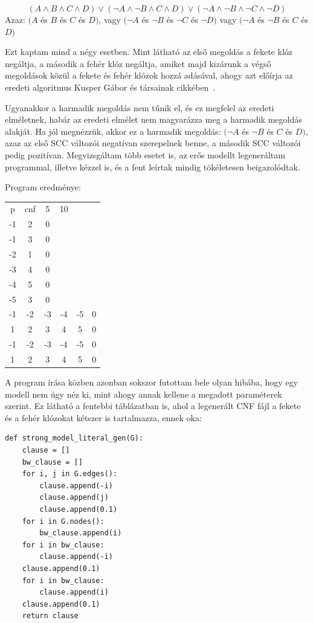 \documentclass[
]{thesis-ekf}
\theoremstyle{definition}
\theoremstyle{remark}
\begin{document}
	\[ (A\wedge B\wedge C\wedge D)\vee (\neg A\wedge\neg B\wedge C\wedge D)\vee (\neg A\wedge\neg B\wedge\neg C\wedge\neg D) \]
	Azaz: $(A$ és $B$ és $C$ és $D)$, vagy $( \neg A $ és $ \neg B $ és $ \neg C $ és $ \neg D )$ vagy $( \neg A $ és $ \neg B $ és $C$ és $D)$
	
	Ezt kaptam mind a négy esetben. Mint látható az első megoldás a fekete klóz negáltja, a második a fehér klóz negáltja, amiket majd kizárunk a végső megoldások közül a fekete és fehér klózok hozzá adásával, ahogy azt előírja az eredeti algoritmus Kusper Gábor és társainak cikkében~\cite{am}.
	
	Ugyanakkor a harmadik megoldás nem tűnik el, és ez megfelel az eredeti elméletnek, habár az eredeti elmélet nem magyarázza meg a harmadik megoldás alakját. Ha jól megnézzük, akkor ez a harmadik megoldás: $( \neg A $ és $ \neg B $ és $C$ és $D)$, azaz az első \textsc{SCC} változói negatívan szerepelnek benne, a második \textsc{SCC} változói pedig pozitívan. Megvizsgáltam több esetet is, az erős modellt legeneráltam programmal, illetve kézzel is, és a fent leírtak mindig tökéletesen beigazolódtak.
	
	Program eredménye:
	
	\begin{tabular}{cccccc}
		p & cnf & 5 & 10 & &   \\
		-1&  2 &  0&   &   &   \\
		-1&  3 &  0&   &   &   \\
		-2&  1 &  0&   &   &   \\
		-3&  4 &  0&   &   &   \\
		-4&  5 &  0&   &   &   \\
		-5&  3 &  0&   &   &   \\
		-1& -2 & -3& -4& -5& 0 \\
		 1&  2 &  3&  4&  5& 0 \\
		-1& -2 & -3& -4& -5& 0 \\
		 1&  2 &  3&  4&  5& 0 \\
	\end{tabular}

	A program írása közben azonban sokszor futottam bele olyan hibába, hogy egy modell nem úgy néz ki, mint ahogy annak kellene a megadott paraméterek szerint. Ez látható a fentebbi táblázatban is, ahol a  legenerált \textsc{CNF} fájl a fekete és a fehér klózokat kétszer is tartalmazza, ennek oka:
	
	\begin{lstlisting}
def strong_model_literal_gen(G):
	clause = []
	bw_clause = []
	for i, j in G.edges():
		clause.append(-i)
		clause.append(j)
		clause.append(0.1)
	for i in G.nodes():
		bw_clause.append(i)
	for i in bw_clause:
		clause.append(-i)
	clause.append(0.1)
	for i in bw_clause:
	 	clause.append(i)
	clause.append(0.1)
	return clause
	\end{lstlisting}
	
\end{document}
